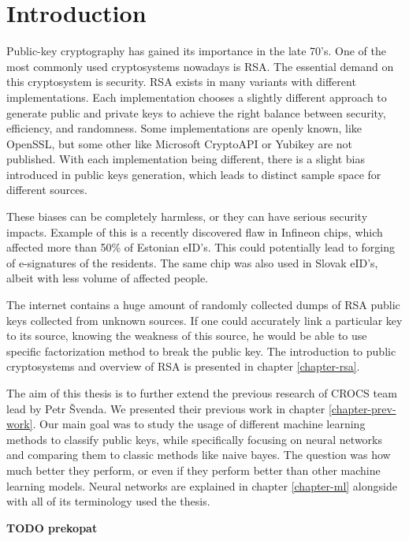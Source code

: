 \chapter*{Introduction}

Public-key cryptography has gained its importance in the late 70's. One of the most commonly used cryptosystems nowadays is RSA. The essential demand on this cryptosystem is security. RSA exists in many variants with different implementations. Each implementation chooses a slightly different approach to generate public and private keys to achieve the right balance between security, efficiency, and randomness. Some implementations are openly known, like OpenSSL, but some other like Microsoft CryptoAPI or Yubikey are not published. With each implementation being different, there is a slight bias introduced in public keys generation, which leads to distinct sample space for different sources. 

These biases can be completely harmless, or they can have serious security impacts. Example of this is a recently discovered flaw in Infineon chips\cite{svenda_2}, which affected more than 50\% of Estonian eID's. This could potentially lead to forging of e-signatures of the residents. The same chip was also used in Slovak eID's, albeit with less volume of affected people.

The internet contains a huge amount of randomly collected dumps of RSA public keys collected from unknown sources. If one could accurately link a particular key to its source, knowing the weakness of this source, he would be able to use specific factorization method to break the public key. The introduction to public cryptosystems and overview of RSA is presented in chapter \ref{chapter-rsa}.

The aim of this thesis is to further extend the previous research of CROCS team \cite{svenda_1}\cite{svenda_3} lead by Petr Švenda. We presented their previous work in chapter \ref{chapter-prev-work}. Our main goal was to study the usage of different machine learning methods to classify public keys, while specifically focusing on neural networks and comparing them to classic methods like naive bayes. The question was how much better they perform, or even if they perform better than other machine learning models. Neural networks are explained in chapter \ref{chapter-ml} alongside with all of its terminology used the thesis.

\textbf{TODO prekopat}

